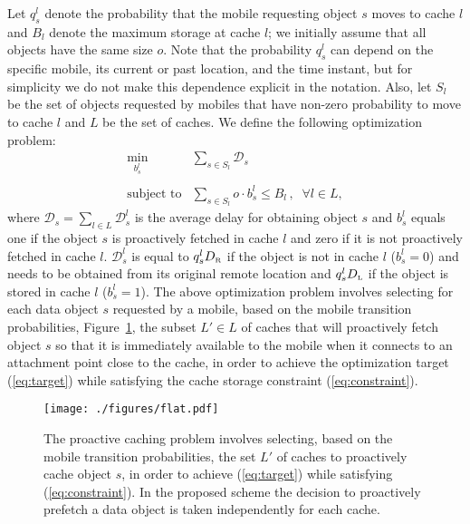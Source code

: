 \documentclass[conference]{IEEEtran}
\newcommand{\Leaf}{\mbox{\tiny L}}
\newcommand{\R}{\mbox{\tiny R}}
\begin{document}
Let $q^l_s$ denote the probability that the mobile requesting object $s$ moves to cache $l$ and $B_l$ denote the maximum storage at cache $l$; we initially assume that all objects have the same size $o$.
Note that the probability $q^l_s$ can depend on the specific mobile, its current or past location, and the time instant, but for simplicity we do not make this dependence explicit in the notation.
Also, let $S_l$ be the set of objects requested by mobiles that have non-zero probability to move to cache $l$ and $L$ be the set of caches. We define the following optimization problem:
\begin{eqnarray}
\min_{b^l_s} &  \displaystyle\sum_{s \in S_l} \mathcal{D}_s \label{eq:target} \\
\, & \nonumber \\
\mbox{subject to} & \displaystyle\sum_{s \in S_l} o \cdot b^l_s \leq B_l \, , \; \; \forall l \in L,\label{eq:constraint}
\end{eqnarray}
where $\mathcal{D}_s=\sum_{l \in L} \mathcal{D}^l_s$ is the average delay for obtaining object $s$ and $b^l_s$ equals one if the object $s$ is proactively fetched in cache $l$ and zero if it is not proactively fetched in cache $l$.
$\mathcal{D}^l_s$ is equal to  $q^l_s D_{\R}$ if the object is not in cache $l$ ($b^l_s=0$) and needs to be obtained from its original remote location and $q^l_s D_{\Leaf}$ if the object is stored in  cache $l$ ($b^l_s=1$).
The above optimization problem involves selecting  for each data object $s$ requested by a mobile, based on the mobile transition probabilities, Figure~\ref{fig:flat}, the subset $L' \in L$ of caches that will proactively fetch object $s$ so that it is immediately available to the mobile when it connects to an attachment point close to the cache, in order to achieve the optimization target (\ref{eq:target})  while satisfying the cache storage constraint (\ref{eq:constraint}).

\begin{figure}[b]
\vspace{-0.1in}
\centering
\texttt{[image: ./figures/flat.pdf]}
\vspace{-0.05in}
\caption{The proactive caching problem involves selecting, based on the mobile transition probabilities, the set $L'$ of caches to proactively cache object $s$, in order to achieve (\ref{eq:target}) while satisfying (\ref{eq:constraint}). In the proposed  scheme the decision  to proactively prefetch a data object is taken independently for each cache.}
\label{fig:flat}
\end{figure}
\end{document}
